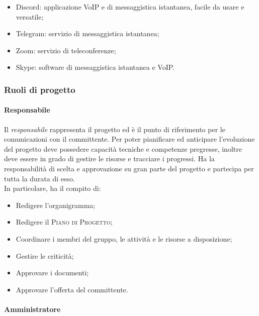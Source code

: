 \begin{itemize}
    \item Discord: applicazione VoIP e di messaggistica istantanea, facile da usare e versatile;
    \item Telegram: servizio di messaggistica istantanea;
    \item Zoom: servizio di teleconferenze;
    \item Skype: software di messaggistica istantanea e VoIP.
\end{itemize}

\subsubsection{Ruoli di progetto}

\paragraph{Responsabile}

Il \emph{responsabile} rappresenta il progetto ed è il punto di riferimento per le comunicazioni con il committente.
Per poter pianificare ed anticipare l'evoluzione del progetto deve possedere capacità tecniche e competenze
pregresse, inoltre deve essere in grado di gestire le risorse e tracciare i progressi. Ha la responsabilità di scelta e
approvazione su gran parte del progetto e partecipa per tutta la durata di esso.\\
In particolare, ha il compito di:
\begin{itemize}
    \item Redigere l'organigramma;
    \item Redigere il \textsc{Piano di Progetto};
    \item Coordinare i membri del gruppo, le attività e le risorse a disposizione;
    \item Gestire le criticità;
    \item Approvare i documenti;
    \item Approvare l'offerta del committente.
\end{itemize}

\paragraph{Amministratore}

